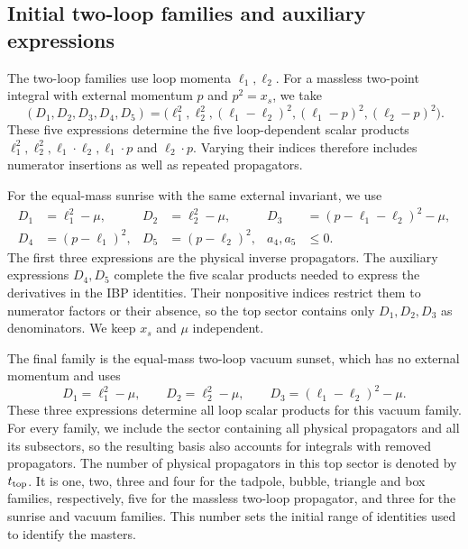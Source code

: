 \documentclass[11pt,a4paper]{article}
\begin{document}
\subsection{Initial two-loop families and auxiliary expressions}
The two-loop families use loop momenta $\ell_1,\ell_2$. For a massless
two-point integral with external momentum $p$ and $p^2=x_s$, we take
\begin{equation}
 (D_1,D_2,D_3,D_4,D_5)
 =\bigl(\ell_1^2,\ell_2^2,(\ell_1-\ell_2)^2,
        (\ell_1-p)^2,(\ell_2-p)^2\bigr).
 \label{eq:generated-two-loop-propagator}
\end{equation}
These five expressions determine the five loop-dependent scalar
products $\ell_1^2,\ell_2^2,\ell_1\cdot\ell_2,\ell_1\cdot p$ and
$\ell_2\cdot p$. Varying their indices therefore includes numerator
insertions as well as repeated propagators.

For the equal-mass sunrise with the same external invariant, we use
\begin{equation}
 \begin{aligned}
 D_1&=\ell_1^2-\mu,&D_2&=\ell_2^2-\mu,&
 D_3&=(p-\ell_1-\ell_2)^2-\mu,\\
 D_4&=(p-\ell_1)^2,&D_5&=(p-\ell_2)^2,&
 a_4,a_5&\leq0.
 \end{aligned}
 \label{eq:generated-sunrise-family}
\end{equation}
The first three expressions are the physical inverse propagators.
The auxiliary expressions $D_4,D_5$ complete the five scalar products
needed to express the derivatives in the IBP identities. Their
nonpositive indices restrict them to numerator factors or their
absence, so the top sector contains only $D_1,D_2,D_3$ as
denominators. We keep $x_s$ and $\mu$ independent.

The final family is the equal-mass two-loop vacuum sunset, which has
no external momentum and uses
\begin{equation}
 D_1=\ell_1^2-\mu,\qquad D_2=\ell_2^2-\mu,\qquad
 D_3=(\ell_1-\ell_2)^2-\mu.
 \label{eq:generated-vacuum-family}
\end{equation}
These three expressions determine all loop scalar products for this
vacuum family. For every family, we include the sector containing all
physical propagators and all its subsectors, so the resulting basis
also accounts for integrals with removed propagators. The number of
physical propagators in this top sector is denoted by $t_{\rm top}$.
It is one, two, three and four for the tadpole, bubble, triangle and
box families, respectively, five for the massless two-loop propagator,
and three for the sunrise and vacuum families. This number sets the
initial range of identities used to identify the masters.
\end{document}
